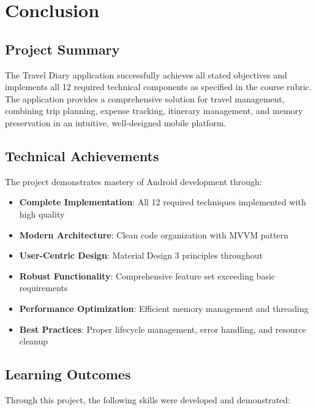 \documentclass[12pt,a4paper]{article}
\begin{document}
\newpage

\section{Conclusion}

\subsection{Project Summary}
The Travel Diary application successfully achieves all stated objectives and implements all 12 required technical components as specified in the course rubric. The application provides a comprehensive solution for travel management, combining trip planning, expense tracking, itinerary management, and memory preservation in an intuitive, well-designed mobile platform.

\subsection{Technical Achievements}
The project demonstrates mastery of Android development through:

\begin{itemize}
    \item \textbf{Complete Implementation}: All 12 required techniques implemented with high quality
    \item \textbf{Modern Architecture}: Clean code organization with MVVM pattern
    \item \textbf{User-Centric Design}: Material Design 3 principles throughout
    \item \textbf{Robust Functionality}: Comprehensive feature set exceeding basic requirements
    \item \textbf{Performance Optimization}: Efficient memory management and threading
    \item \textbf{Best Practices}: Proper lifecycle management, error handling, and resource cleanup
\end{itemize}

\subsection{Learning Outcomes}
Through this project, the following skills were developed and demonstrated:
\end{document}
